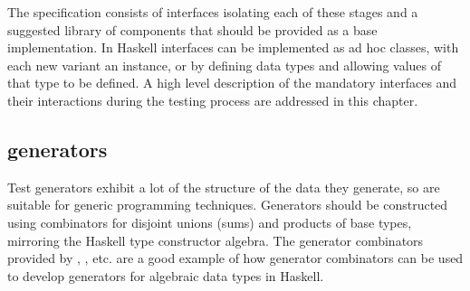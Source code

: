 
The specification consists of interfaces isolating each of these stages
and a suggested library of components that should be provided as a base implementation.
In Haskell interfaces can be implemented as ad hoc classes,
with each new variant an instance, 
or by defining data types and allowing values of that type to be defined.
A high level description of the mandatory interfaces and 
their interactions during the testing process are addressed in this chapter.


\subsection{generators}
Test generators exhibit a lot of the structure of the data they generate,
so are suitable for generic programming techniques.
Generators should be constructed using combinators for 
disjoint unions (sums) and products of base types,
mirroring the Haskell type constructor algebra.
The generator combinators provided by \QC, \SC, etc.
are a good example of how generator combinators can be used
to develop generators for algebraic data types in Haskell.


